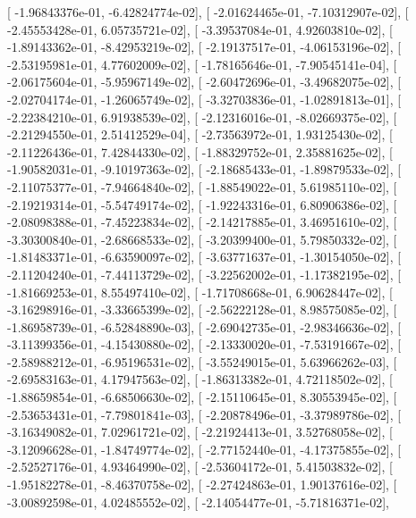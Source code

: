 \documentclass{article}
\begin{document}
       [ -1.96843376e-01,  -6.42824774e-02],
       [ -2.01624465e-01,  -7.10312907e-02],
       [ -2.45553428e-01,   6.05735721e-02],
       [ -3.39537084e-01,   4.92603810e-02],
       [ -1.89143362e-01,  -8.42953219e-02],
       [ -2.19137517e-01,  -4.06153196e-02],
       [ -2.53195981e-01,   4.77602009e-02],
       [ -1.78165646e-01,  -7.90545141e-04],
       [ -2.06175604e-01,  -5.95967149e-02],
       [ -2.60472696e-01,  -3.49682075e-02],
       [ -2.02704174e-01,  -1.26065749e-02],
       [ -3.32703836e-01,  -1.02891813e-01],
       [ -2.22384210e-01,   6.91938539e-02],
       [ -2.12316016e-01,  -8.02669375e-02],
       [ -2.21294550e-01,   2.51412529e-04],
       [ -2.73563972e-01,   1.93125430e-02],
       [ -2.11226436e-01,   7.42844330e-02],
       [ -1.88329752e-01,   2.35881625e-02],
       [ -1.90582031e-01,  -9.10197363e-02],
       [ -2.18685433e-01,  -1.89879533e-02],
       [ -2.11075377e-01,  -7.94664840e-02],
       [ -1.88549022e-01,   5.61985110e-02],
       [ -2.19219314e-01,  -5.54749174e-02],
       [ -1.92243316e-01,   6.80906386e-02],
       [ -2.08098388e-01,  -7.45223834e-02],
       [ -2.14217885e-01,   3.46951610e-02],
       [ -3.30300840e-01,  -2.68668533e-02],
       [ -3.20399400e-01,   5.79850332e-02],
       [ -1.81483371e-01,  -6.63590097e-02],
       [ -3.63771637e-01,  -1.30154050e-02],
       [ -2.11204240e-01,  -7.44113729e-02],
       [ -3.22562002e-01,  -1.17382195e-02],
       [ -1.81669253e-01,   8.55497410e-02],
       [ -1.71708668e-01,   6.90628447e-02],
       [ -3.16298916e-01,  -3.33665399e-02],
       [ -2.56222128e-01,   8.98575085e-02],
       [ -1.86958739e-01,  -6.52848890e-03],
       [ -2.69042735e-01,  -2.98346636e-02],
       [ -3.11399356e-01,  -4.15430880e-02],
       [ -2.13330020e-01,  -7.53191667e-02],
       [ -2.58988212e-01,  -6.95196531e-02],
       [ -3.55249015e-01,   5.63966262e-03],
       [ -2.69583163e-01,   4.17947563e-02],
       [ -1.86313382e-01,   4.72118502e-02],
       [ -1.88659854e-01,  -6.68506630e-02],
       [ -2.15110645e-01,   8.30553945e-02],
       [ -2.53653431e-01,  -7.79801841e-03],
       [ -2.20878496e-01,  -3.37989786e-02],
       [ -3.16349082e-01,   7.02961721e-02],
       [ -2.21924413e-01,   3.52768058e-02],
       [ -3.12096628e-01,  -1.84749774e-02],
       [ -2.77152440e-01,  -4.17375855e-02],
       [ -2.52527176e-01,   4.93464990e-02],
       [ -2.53604172e-01,   5.41503832e-02],
       [ -1.95182278e-01,  -8.46370758e-02],
       [ -2.27424863e-01,   1.90137616e-02],
       [ -3.00892598e-01,   4.02485552e-02],
       [ -2.14054477e-01,  -5.71816371e-02],
\end{document}
